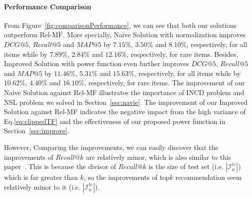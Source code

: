 \documentclass[sigconf]{acmart}
\begin{document}

\paragraph{Performance Comparison}

From Figure~\ref{fig:comparisonPerformance}, we can see that both our solutions outperform Rel-MF. More specially, Naive Solution with normalization improves $DCG@5$, $Recall@5$ and $MAP@5$ by $7.15\%$, $3.50\%$ and $8.10\%$, respectively, for all items while by  $7.89\%$, $2.84\%$ and $12.16\%$, respectively, for rare items. Besides, Improved Solution with power function even further improves $DCG@5$, $Recall@5$ and $MAP@5$ by $11.46\%$, $5.31\%$ and $15.63\%$, respectively, for all items while by  $10.62\%$, $4.40\%$ and $16.10\%$, respectively, for rare items. The improvement of our Naive Solution against Rel-MF illustrates the importance of INCD problem and NSL problem we solved in Section~\ref{sec:navie}. The improvement of our Improved Solution against Rel-MF indicates the negative impact from the high variance of Eq.\eqref{eq:clippedTF} and the effectiveness of our proposed power function in Section~\ref{sec:improve}.

However, Comparing the improvements, we can easily discover that the improvements of $Recall@k$ are relatively minor, which is also similar to this paper~\cite{saito2020unbiased}. This is because the divisor of $Recall@k$ is the size of test set (i.e. $|\mathcal{I}_{u}^{te}|$) which is far greater than $k$, so the improvements of top$k$ recommendation seem relatively minor to it (i.e. $|\mathcal{I}_{u}^{te}|$).
\end{document}
